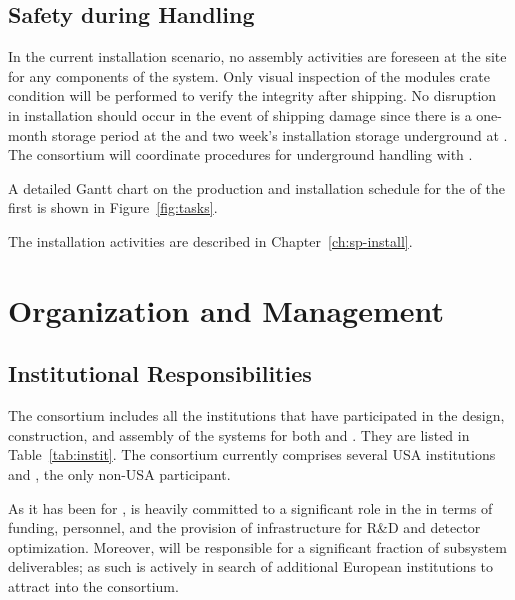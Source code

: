 \subsection{Safety during Handling} %
\label{sec:fdsp-hv-transport-safety}


In the current installation scenario, no assembly activities are foreseen at the  site for any components of the  system. Only visual inspection of the  modules crate condition will be performed to verify the integrity after shipping. 
No disruption in installation should occur in the event of shipping damage since there is a one-month storage period at the  and two week's installation storage underground at .  The  consortium will coordinate procedures for underground handling with .

A detailed Gantt chart on the production and installation schedule for the  of the first  is shown in Figure~\ref{fig:tasks}.

The installation activities are described in Chapter~\ref{ch:sp-install}.

\section{Organization and Management}
\label{sec:fdsp-hv-org}


\subsection{Institutional Responsibilities}
\label{sec:fdsp-hv-org-consortium}
The  consortium %
includes all the institutions that have participated in the design, construction, and assembly of the  systems for both   and . They are listed in 
Table~\ref{tab:instit}. 
The consortium  currently comprises several USA institutions and , %
the only non-USA participant.  
 
  
As it has been %
for ,  is heavily committed to a significant role in the   in terms of funding, personnel, 
 and the provision of infrastructure for R\&D and detector optimization. Moreover,  will be responsible for a significant fraction of subsystem deliverables; as such   is actively in search of additional European institutions to attract into the consortium. 
 

